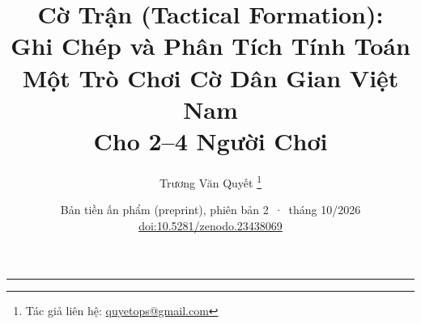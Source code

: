 


\title{%
  \textbf{Cờ Trận (Tactical Formation):}\\[0.3em]
  \textbf{Ghi Chép và Phân Tích Tính Toán}\\[0.3em]
  \textbf{Một Trò Chơi Cờ Dân Gian Việt Nam}\\[0.3em]
  \textbf{Cho 2--4 Người Chơi}
}
\author{%
  Trương Văn Quyết%
  \thanks{Tác giả liên hệ: \href{mailto:quyetops@gmail.com}{quyetops@gmail.com}}
}
\date{Bản tiền ấn phẩm (preprint), phiên bản 2 \,·\, tháng 10/2026\\[0.3em]
  \href{https://doi.org/10.5281/zenodo.23438069}{doi:10.5281/zenodo.23438069}}



\maketitle



\vspace{0.8em}
\hrule
\vspace{0.4em}

\tableofcontents
\newpage












\appendix





\renewcommand{\refname}{Tài liệu tham khảo}



